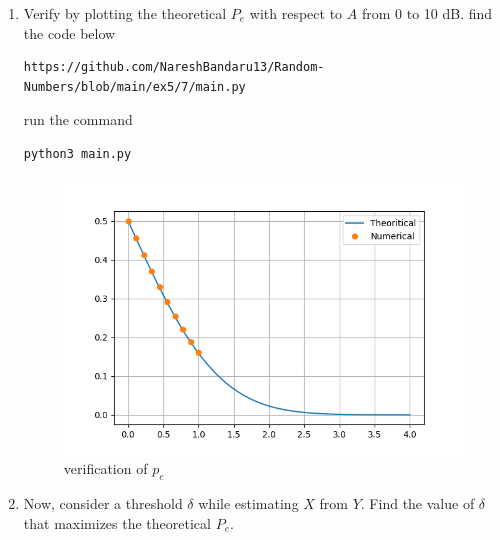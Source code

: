 \documentclass[journal,12pt,twocolumn]{IEEEtran}
\renewcommand\thesection{\arabic{section}}
\begin{document}
\begin{enumerate}[label=\thesection.\arabic*
,ref=\thesection.\theenumi]
Given X is equiprobable so we have
\begin{align*}
    P_e &= P_{e|0}  \pr{X=1} + P_{e|1}  \pr{X=-1} \\
    &= \frac{1}{2} P_{e|0} + \frac{1}{2} P_{e|1} \\
    &= \frac{1}{2} Q_N(A) + \frac{1}{2} Q_N(A) \\
    &= Q_N(A)
\end{align*}

\item
Verify by plotting  the theoretical $P_e$ with respect to $A$ from 0 to 10 dB.  
find the code below
\begin{lstlisting}
https://github.com/NareshBandaru13/Random-Numbers/blob/main/ex5/7/main.py
\end{lstlisting}
run the command
\begin{lstlisting}
python3 main.py
\end{lstlisting}
\begin{figure}[H]
    \includegraphics[scale = 0.6]{verifyp.png}
    \caption{verification of $p_e$}
    \label{fig:my_verifyP}
\end{figure}


\item Now, consider a threshold $\delta$  while estimating $X$ from $Y$. Find the value of $\delta$ that maximizes the theoretical $P_e$.


\end{enumerate}
\end{document}
